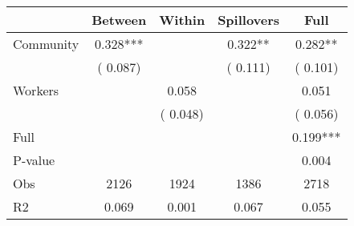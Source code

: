 
\begin{tabular}{l*{4}{c}}\hline&\multicolumn{1}{c}{Between}&\multicolumn{1}{c}{Within}&\multicolumn{1}{c}{Spillovers}&\multicolumn{1}{c}{Full}\\ \hline
 Community             &              0.328***      &                                               &        0.322** &         0.282**                            \\ 
                               &        (       0.087)           &                                       &       (       0.111)     &      (       0.101)                                           \\ 
 Workers       &                                               &        0.058    &                                &             0.051                            \\ 
                               &                                               & (       0.048)                  &                                        &      (       0.056)                                           \\ 
\hline                                                                                                                                                                                                                                            
 Full                  &                                               &                                               &                                        &             0.199***                                     \\ 
 P-value               &                                               &                                               &                                        &             0.004                                           \\ 
 Obs                   &               2126               &       1924                       &       1386                &              2718                                               \\ 
 R2                    &                      0.069              &              0.001                      &              0.067               &                     0.055                                              \\ 
\hline \end{tabular}                                                                                                                                                                                                              